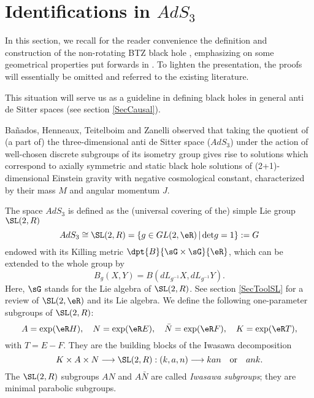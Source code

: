 \section{Identifications in \texorpdfstring{$AdS_3$}{AdS3}}\label{secBTZ}

In this section, we recall for the reader convenience the definition and construction of the non-rotating BTZ black hole \cite{BTZ_un,BTZ_deux}, emphasizing on some geometrical properties put forwards in \cite{BTZB_un,BDRS,Keio,Clement}. To lighten the presentation, the proofs will essentially be omitted and referred to the existing literature.

This situation will serve us as a guideline in defining black holes in general anti de Sitter spaces (see section \ref{SecCausal}).

Ba\~nados, Henneaux, Teitelboim and Zanelli observed that taking the quotient of (a part of) the three-dimensional anti de Sitter space ($AdS_3$) under the action of well-chosen discrete subgroups of its isometry group gives rise to solutions which correspond to axially symmetric and static black hole solutions of (2+1)-dimensional Einstein gravity with negative cosmological constant, characterized by their mass $M$ and angular momentum $J$.

The space $AdS_3$ is defined as the (universal covering of the) simple Lie group $\SL(2,R)$
\begin{equation}\label{AdS3}
AdS_3 \cong \SL(2,R) = \{g \in GL(2,\eR) \, | \, \mbox{det} g = 1 \}:= G
\end{equation}
endowed with its Killing metric $\dpt{B}{\sG\times\sG}{\eR}$, which can be extended to the whole group by
\begin{equation}
B_g(X,Y)=B(dL_{g^{-1}}X,dL_{g^{-1}}Y).
\end{equation}
Here, $\sG$ stands for the Lie algebra of $\SL(2,R)$. See section \ref{SecToolSL} for a review of $\SL(2,\eR)$ and its Lie algebra. We define the following one-parameter subgroups of $\SL(2,R)$:
\begin{equation}\label{IwasawaSubgroups}
A = \exp(\eR H), \quad  N = \exp(\eR E), \quad \bar{N}=\exp(\eR
F), \quad K=\exp(\eR T),
\end{equation}
with $T=E-F$. They are the building blocks of the Iwasawa decomposition
\begin{equation}
K \times A \times N \longrightarrow \SL(2,R): (k,a,n)
\longrightarrow kan \quad \mbox{or} \quad ank.
 \end{equation}
 The $\SL(2,R)$ subgroups $AN$ and $A\bar{N}$ are called \emph{Iwasawa subgroups}; they are minimal parabolic subgroups.

